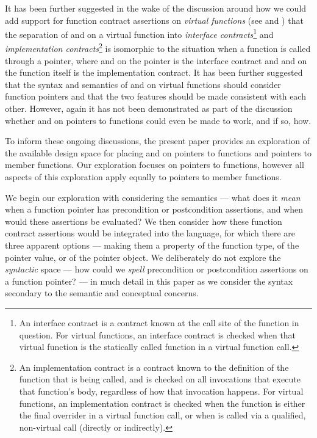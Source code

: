 It has been further suggested in the wake of the discussion around how we could add support for function contract assertions on \emph{virtual functions} (see \cite{P3097R0} and \cite{P3165R0}) that the separation of  and  on a virtual function into \emph{interface contracts}\footnote{An interface contract is a contract known at the call site of the function in question. For virtual functions, an interface contract is checked when that virtual function is the statically called function in a virtual function call.} and \emph{implementation contracts}\footnote{An implementation contract is a contract known to the definition of the function that is being called, and is checked on all invocations that execute that function's body, regardless of how that invocation happens. For virtual functions, an implementation contract is checked when the function is either the final overrider in a virtual function call, or when is called via a qualified, non-virtual call (directly or indirectly).} is isomorphic to the situation when a function is called through a pointer, where  and  on the pointer is the interface contract and  and  on the function itself is the implementation contract. It has been further suggested that the syntax and semantics of  and  on virtual functions should consider function pointers and that the two features should be made consistent with each other. However, again it has not been demonstrated as part of the discussion whether  and  on pointers to functions could even be made to work, and if so, how.

To inform these ongoing discussions, the present paper provides an exploration of the available design space for placing  and  on pointers to functions and pointers to member functions. Our exploration focuses on pointers to functions, however all aspects of this exploration apply equally to pointers to member functions.

We begin our exploration with considering the semantics --- what does it \emph{mean} when a function pointer has precondition or postcondition assertions, and when would these assertions be evaluated? We then consider how these function contract assertions would be integrated into the language, for which there are three apparent options --- making them a property of the function type, of the pointer value, or of the pointer object. We deliberately do not explore the \emph{syntactic} space --- how could we \emph{spell} precondition or postcondition assertions on a function pointer? --- in much detail in this paper as we consider the syntax secondary to the semantic and conceptual concerns. 

